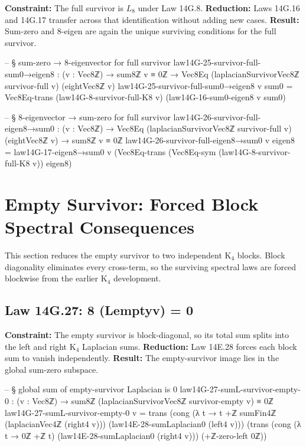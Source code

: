 \documentclass[11pt,a4paper]{book}
\def\Sigma{Sigma}%
\def\mathrm#1{#1}%
\def\texorpdfstring#1#2{#2}%
\begin{document}
\textbf{Constraint:} The full survivor is $L_8$ under Law 14G.8.
\textbf{Reduction:} Laws 14G.16 and 14G.17 transfer across that identification without adding new cases.
\textbf{Result:} Sum-zero and $8$-eigen are again the unique surviving conditions for the full survivor.

\begin{code}
-- § sum-zero → 8-eigenvector for full survivor
law14G-25-survivor-full-sum0→eigen8 : (v : Vec8ℤ) → sum8ℤ v ≡ 0ℤ → Vec8Eq (laplacianSurvivorVec8ℤ survivor-full v) (eightVec8ℤ v)
law14G-25-survivor-full-sum0→eigen8 v sum0 =
  Vec8Eq-trans
    (law14G-8-survivor-full-K8 v)
    (law14G-16-sum0-eigen8 v sum0)

-- § 8-eigenvector → sum-zero for full survivor
law14G-26-survivor-full-eigen8→sum0 : (v : Vec8ℤ) → Vec8Eq (laplacianSurvivorVec8ℤ survivor-full v) (eightVec8ℤ v) → sum8ℤ v ≡ 0ℤ
law14G-26-survivor-full-eigen8→sum0 v eigen8 =
  law14G-17-eigen8→sum0 v
    (Vec8Eq-trans
      (Vec8Eq-sym (law14G-8-survivor-full-K8 v))
      eigen8)
\end{code}

\section{Empty Survivor: Forced Block Spectral Consequences}

This section reduces the empty survivor to two independent K$_4$ blocks.
Block diagonality eliminates every cross-term, so the surviving spectral laws are forced blockwise from the earlier K$_4$ development.

\subsection{Law 14G.27: \texorpdfstring{$\Sigma_8 (L_{\mathrm{empty}}\,v) = 0$}{8 (Lemptyv) = 0}}

\textbf{Constraint:} The empty survivor is block-diagonal, so its total sum splits into the left and right K$_4$ Laplacian sums.
\textbf{Reduction:} Law 14E.28 forces each block sum to vanish independently.
\textbf{Result:} The empty-survivor image lies in the global sum-zero subspace.

\begin{code}
-- § global sum of empty-survivor Laplacian is 0
law14G-27-sumL-survivor-empty-0 : (v : Vec8ℤ) → sum8ℤ (laplacianSurvivorVec8ℤ survivor-empty v) ≡ 0ℤ
law14G-27-sumL-survivor-empty-0 v =
  trans
    (cong (λ t → t +ℤ sumFin4ℤ (laplacianVec4ℤ (right4 v))) (law14E-28-sumLaplacian0 (left4 v)))
    (trans
      (cong (λ t → 0ℤ +ℤ t) (law14E-28-sumLaplacian0 (right4 v)))
      (+ℤ-zero-left 0ℤ))
\end{code}
\end{document}
